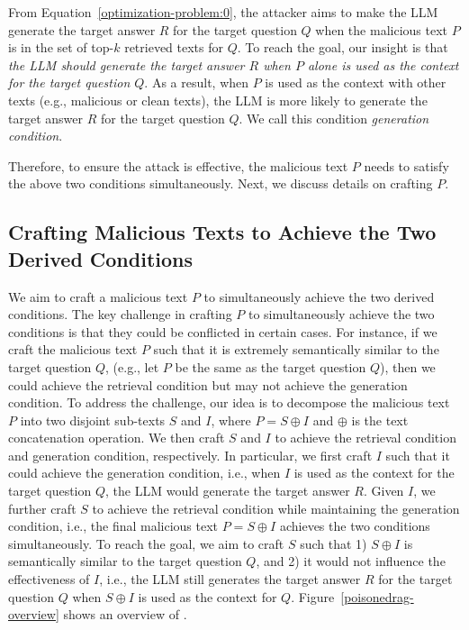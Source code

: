 From Equation~\ref{optimization-problem:0}, the attacker aims to make the LLM generate the target answer $R$ for the target question $Q$ when the malicious text $P$ is in the set of top-$k$ retrieved texts for $Q$. 
To reach the goal, our insight is that \emph{the LLM should generate the target answer $R$ when $P$ alone is used as the context for the target question $Q$}. 
As a result, when $P$ is used as the context with other texts (e.g., malicious or clean texts), the LLM is more likely to generate the target answer $R$ for the target question $Q$. 
We call this condition \emph{generation condition}. 

Therefore, to ensure the attack is effective, the malicious text $P$ needs to satisfy the above two conditions simultaneously. Next, we discuss details on crafting $P$.


\subsection{Crafting Malicious Texts to Achieve the Two Derived Conditions}


We aim to craft a malicious text $P$ to simultaneously achieve the two derived conditions. The key challenge in crafting $P$ to simultaneously achieve the two conditions is that they could be
conflicted in certain cases. For instance, if we craft the malicious text $P$ such that it is extremely semantically similar to the target question $Q$, (e.g., let $P$ be the same as the target question $Q$), then we could achieve the retrieval condition but may not achieve the generation condition. 
To address the challenge, our idea is 
to decompose the malicious text $P$ into two disjoint sub-texts $S$ and $I$, where $P = S \oplus I$ and 
$\oplus$ is the text concatenation operation. We then craft $S$ and $I$ to achieve the retrieval condition and generation condition, respectively. In particular, we first craft $I$ such that it could achieve the generation condition, i.e., when $I$ is used as the context for the target question $Q$, the LLM would generate the target answer $R$.  Given $I$, we further craft $S$ to achieve the retrieval condition while maintaining the generation condition, i.e., the final malicious text $P = S \oplus I$ achieves the two conditions simultaneously. To reach the goal, we aim to craft $S$ such that 1) $S \oplus I$ is semantically similar to the target question $Q$, and 2) it would not influence the effectiveness of $I$, i.e., the LLM still generates the target answer $R$ for the target question $Q$ when $S \oplus I$ is used as the context for $Q$. Figure~\ref{poisonedrag-overview} shows an overview of {\name}.

